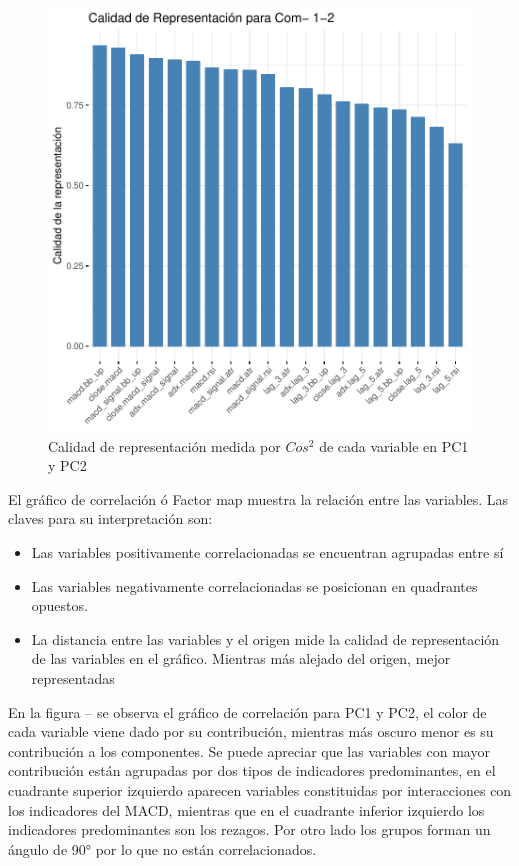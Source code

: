 \documentclass[a4paper,12pt]{Latex/Classes/PhDthesisPSnPDF}
\begin{document}
\begin{figure}[H]
\centering
\includegraphics{main-015}
\caption{Calidad de representación medida por $Cos^2$ de cada variable en PC1 y PC2}
\end{figure}

El gráfico de correlación ó Factor map muestra la relación entre las variables. Las claves para su interpretación son:

\begin{itemize}
\item Las variables positivamente correlacionadas se encuentran agrupadas entre sí
\item Las variables negativamente correlacionadas se posicionan en quadrantes opuestos.
\item La distancia entre las variables y el origen mide la calidad de representación de las variables en el gráfico. Mientras más alejado del origen, mejor representadas 
\end{itemize}

En la figura -- se observa el gráfico de correlación para PC1 y PC2, el color de cada variable viene dado por su contribución, mientras más oscuro menor es su contribución a los componentes. Se puede apreciar que las variables con mayor contribución están agrupadas por dos tipos de indicadores predominantes, en el cuadrante superior izquierdo aparecen variables constituidas por interacciones con los indicadores del MACD, mientras que en el cuadrante inferior izquierdo los indicadores predominantes son los rezagos. Por otro lado los grupos forman un ángulo de 90° por lo que no están correlacionados.
\end{document}
